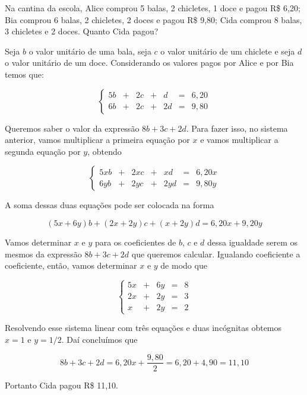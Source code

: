\begin{problem}
Na cantina da escola, Alice comprou 5 balas, 2 chicletes, 1 doce e pagou R\$ 6,20;
Bia comprou 6 balas, 2 chicletes, 2 doces e pagou R\$ 9,80;
Cida comprou 8 balas, 3 chicletes e 2 doces. Quanto Cida pagou?
\end{problem}
\begin{solution}
Seja $b$ o valor unitário de uma bala, seja $c$ o valor unitário de um chiclete e seja $d$ o valor unitário de um doce.
Considerando os valores pagos por Alice e por Bia temos que:

$$\left\{\begin{array}{rrrrrrr}
 5b & + &   2c & + &    d & = &   6,20 \\
 6b & + &   2c & + &   2d & = &   9,80
\end{array} \right.$$

Queremos saber o valor da expressão $8b + 3c + 2d$.
Para fazer isso, no sistema anterior, vamos multiplicar a primeira equação por $x$ e vamos multiplicar a segunda equação por $y$, obtendo

$$\left\{\begin{array}{rrrrrrr}
 5xb & + &   2xc & + &    xd & = &   6,20x \\
 6yb & + &   2yc & + &   2yd & = &   9,80y
\end{array} \right.$$

A soma dessas duas equações pode ser colocada na forma

$$(5x+6y)b + (2x+2y)c + (x+2y)d = 6,20x + 9,20y$$

Vamos determinar $x$ e $y$ para os coeficientes de $b$, $c$ e $d$ dessa igualdade serem os mesmos da expressão  $8b + 3c + 2d$ que queremos calcular. Igualando coeficiente a coeficiente, então, vamos determinar $x$ e $y$ de modo que

$$\left\{\begin{array}{rrrrrrr}
 5x & + &  6y & = &   8 \\
 2x & + &  2y & = &   3 \\
  x & + &  2y & = &   2 
\end{array} \right.$$

Resolvendo esse sistema linear com três equações e duas incógnitas obtemos $x=1$ e $y=1/2$. Daí concluímos que

$$8b + 3c + 2d =6,20x + \dfrac{9,80}{2} = 6,20 + 4,90 = 11,10$$

Portanto Cida pagou R\$ 11,10.
\end{solution}

